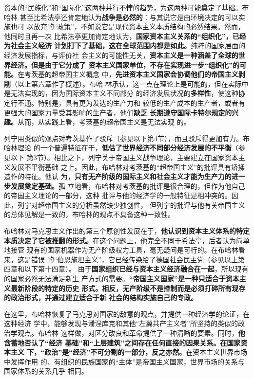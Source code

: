 资本的“民族化”和“国际化”这两种并行不悖的趋势，为这两种可能奠定了基础。布哈林
甚至比希法亭还肯定地认为\textbf{战争是必然的}：与其说它是由环境决定的可以实施也可
以放弃的“政策”，不如说它是现代资本主义本质结构的必然结果。然而，他同时且再一次
比希法亭更加肯定地认为，\textbf{国家资本主义关系的“组织化”，已经为社会主义经济
  计划打下了基础，这在全球范围内都是如此。}纯粹的国家层面的经济发展指标，与评价社
会主义的可能性无关，\textbf{资本主义是一种涵盖了全球的世界经济。但是由于它分成了
  资本主义国家单位，不存在实现进一步“组织化”的可能。}在考茨基的超帝国主义概念
中，\textbf{先进资本主义国家会协调他们的帝国主义剥削}（以上第六章作了概述）。布哈
林承认，这一点在理论上是可能的，但在实际中是无法实现的，因为国际资本主义不同部分
的经济发展状况的\textbf{多样性}，使这种协定行不通。特别是，具有更为发达的生产力和
较低的生产成本的生产者，或者有更强大的国家力量受其影响的生产者，他们\textbf{缺乏
  长期遵守国际卡特尔规定的兴趣。}从而，从实践上看，考茨基的超帝国主义是无法实现
的。

列宁用类似的观点对考茨基作了驳斥（参见以下第4节），而且驳斥得更加有力。布哈林理论
的一个普遍特征在于，\textbf{低估了世界经济不同部分经济发展的不平衡}（参见以下
第3节）。相比之下，列宁关于帝国主义战争理论，主要建立在国家资本主义发展不平衡基础
之上。因此，布哈林对考茨基的“超帝国主义”的批评具有矫揉造作的特征。他认
为，\textbf{只有无产阶级的国际主义和社会主义才能为生产力的进一步发展奠定基础。}孤
立地看，布哈林对考茨基的批评是很合理的，但作为他自己的帝国主义理论的一部分，这种
批评与他的经济学的一般特征是相冲突的。因此，列宁对超帝国主义的分析虽然缺少独创性，
但列宁的批评与他有关帝国主义的总体见解是一致的，布哈林的观点不具备这种一致性。

布哈林对马克思主义作出的第三个原创性发展在于，\textbf{他认识到资本主义体系的特定
  本质决定了它被推翻的形式。}在这个问题上，他完全不同于希法亭，后者认为简单地接管
现有的国家机器作为无产阶级权力工具，毫无疑问是可行的。在布哈林看来，这是错误
的“伯恩施坦主义”，它已经传染给了德国社会民主党（参见以上第四章和以下第十四章）。
由于\textbf{国家组织已经与资本主义经济融合在一起}，所以现有的国家必然无法满足新生
产方式的需要。\textbf{“帝国主义国家”是一种只适合于资本主义最新阶段的特定的历史
  形式。相反，无产阶级不是控制而是必须打碎所有现存的政治形式，并通过建立适合于新
  社会的结构实施自己的专政。}

在这里，布哈林恢复了马克思对国家的敌意的观点，并提供一种经济学的论证，在这种经济
学中，能够发现与潘涅库克和其他“左翼共产主义者”所坚持的类似的政治学观点。布哈林
这样做，对区分改良和革命提供了一种清晰的要素。同时，\textbf{他含蓄地否认了“经济
  基础”和“上层建筑”之间存在任何直接的因果关系。在国家资本主义
  下，“政治”是“经济”不可分割的一部分，反之亦然。}在资本主义世界市场中发挥作用
的、有组织的民族国家的“主体”是帝国主义国家，世界市场的关系与国家体系的关系几乎
相同。
\vfill


